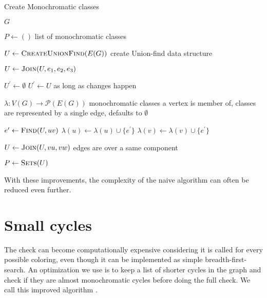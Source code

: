 \begin{algorithm}
	\caption[Create Monochromatic classes]{Create Monochromatic classes~\cite{my_paper}}%
	\label{alg:create_monochromatic_classes}
	\begin{algorithmic}[1]
		\Require{} $G$

		\Ensure{} $P \gets ()$
		\Comment{} list of monochromatic classes

		\State{} $U \gets \Call{CreateUnionFind}{E(G)}$
		\Comment{} create Union-find data structure

		\State{} $U \gets \Call{Join}{U, e_{1}, e_{2}, e_{3}}$
		\EndFor{}

		\State{} $U^\prime \gets \emptyset$
		\State{} $U^\prime \gets U$
		\Comment{} as long as changes happen

		\State{} $\lambda : V(G) \to \mathcal{P}(E(G))$
		\Comment{} monochromatic classes a vertex is member of,
		\State{}
		\Comment{} classes are represented by a single edge, defaults to $\emptyset$

		\State{} $e^\prime \gets \Call{Find}{U, uv}$
		\State{} $\lambda(u) \gets \lambda(u) \cup \{e^\prime\}$
		\State{} $\lambda(v) \gets \lambda(v) \cup \{e^\prime\}$
		\EndFor{}

		\State{} $U \gets \Call{Join}{U, vu, vw}$
		\Comment{} edges are over a same component
		\EndIf{}
		\EndFor{}
		\EndWhile{}

		\State{} $P \gets \Call{Sets}{U}$

	\end{algorithmic}
\end{algorithm}

With these improvements, the complexity of the naive algorithm can often be
reduced even further.

\section{Small cycles}%
\label{sec:small_cycles}

The check \IsNACColoring{} can become computationally expensive
considering it is called for every possible coloring,
even though it can be implemented as simple breadth-first-search.
An optimization we use is to keep a list of shorter cycles in the graph and
check if they are almost monochromatic cycles before doing the full check.
We call this improved \Naive{} algorithm \NaiveCycles{}.

